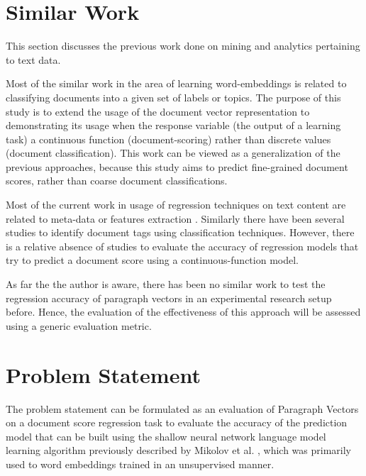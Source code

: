 \documentclass[conference]{IEEEtran}
\begin{document}
\vspace{5mm}

\section{Similar Work}
    This section discusses the previous work done on mining and analytics pertaining to text data.

    Most of the similar work in the area of learning word-embeddings is related to classifying documents into a given set of labels or topics. 
    The purpose of this study is to extend the usage of the document vector representation to demonstrating its usage when the response variable (the output of a learning task) a continuous function (document-scoring) rather than discrete values (document classification). This work can be viewed as a generalization of the previous approaches, because this study aims to predict fine-grained document scores, rather than coarse document classifications.

    Most of the current work in usage of regression techniques on text content are related to meta-data or features extraction \cite{su2015genetic} \cite{weissman2016natural}. Similarly there have been several studies to identify document tags using classification techniques\cite{bespalov2011sentiment}\cite{pang2002thumbs}. However, there is a relative absence of studies to evaluate the accuracy of regression models that try to predict a document score using a continuous-function model.

    As far the the author is aware, there has been no similar work to test the regression accuracy of paragraph vectors in an experimental research setup before. Hence, the evaluation of the effectiveness of this approach will be assessed using a generic evaluation metric.

\vspace{5mm}

\section{Problem Statement} \label{problem_statment}
    The problem statement can be formulated as an evaluation of Paragraph Vectors\cite{le2014distributed} on a document score regression task to evaluate the accuracy of the prediction model that can be built using the shallow neural network language model learning algorithm previously described by Mikolov et al. \cite{mikolov2013efficient}, which was primarily used to word embeddings trained in an unsupervised manner.
\end{document}
